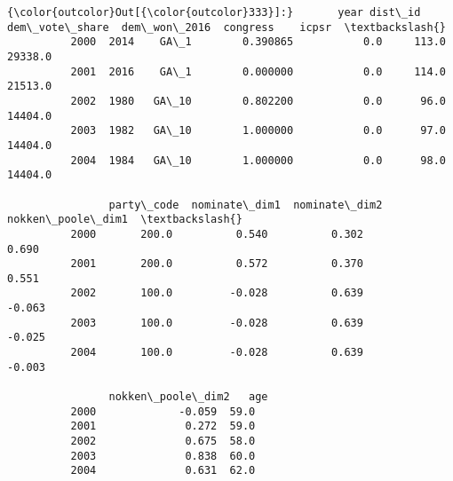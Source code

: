 \documentclass[11pt]{article}
\begin{document}
\begin{Verbatim}[commandchars=\\\{\}]
{\color{outcolor}Out[{\color{outcolor}333}]:}       year dist\_id  dem\_vote\_share  dem\_won\_2016  congress    icpsr  \textbackslash{}
          2000  2014    GA\_1        0.390865           0.0     113.0  29338.0   
          2001  2016    GA\_1        0.000000           0.0     114.0  21513.0   
          2002  1980   GA\_10        0.802200           0.0      96.0  14404.0   
          2003  1982   GA\_10        1.000000           0.0      97.0  14404.0   
          2004  1984   GA\_10        1.000000           0.0      98.0  14404.0   
          
                party\_code  nominate\_dim1  nominate\_dim2  nokken\_poole\_dim1  \textbackslash{}
          2000       200.0          0.540          0.302              0.690   
          2001       200.0          0.572          0.370              0.551   
          2002       100.0         -0.028          0.639             -0.063   
          2003       100.0         -0.028          0.639             -0.025   
          2004       100.0         -0.028          0.639             -0.003   
          
                nokken\_poole\_dim2   age  
          2000             -0.059  59.0  
          2001              0.272  59.0  
          2002              0.675  58.0  
          2003              0.838  60.0  
          2004              0.631  62.0  
\end{Verbatim}
            
\end{document}
